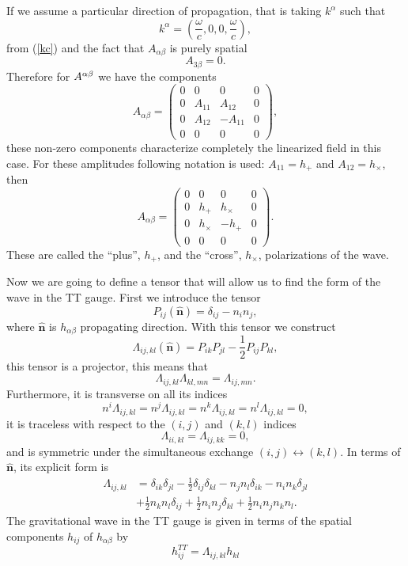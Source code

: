 If we assume a particular direction of propagation, that is taking
$k^{\alpha}$ such that
\begin{equation}
k^{\alpha}=\left(\frac{\omega}{c},0,0,\frac{\omega}{c}\right),\label{eq:kz}
\end{equation}
from (\ref{kc}) and the fact that $A_{\alpha\beta}$ is purely spatial
\[
A_{3\beta}=0.
\]
Therefore for $A^{\alpha\text{\ensuremath{\beta}}}$ we have the components
\[
A_{\alpha\beta}=\left(\begin{array}{cccc}
0 & 0 & 0 & 0\\
0 & A_{11} & A_{12} & 0\\
0 & A_{12} & -A_{11} & 0\\
0 & 0 & 0 & 0
\end{array}\right),
\]
these non-zero components characterize completely the linearized field
in this case. For these amplitudes following notation is used: $A_{11}=h_{+}$
and $A_{12}=h_{\times}$, then
\begin{equation}
A_{\alpha\beta}=\left(\begin{array}{cccc}
0 & 0 & 0 & 0\\
0 & h_{+} & h_{\times} & 0\\
0 & h_{\times} & -h_{+} & 0\\
0 & 0 & 0 & 0
\end{array}\right).\label{eq:A-plus-cross}
\end{equation}
These are called the ``plus'', $h_{+}$, and the ``cross'', $h_{\times}$,
polarizations of the wave. 

Now we are going to define a tensor that will allow us to find the
form of the wave in the TT gauge. First we introduce the tensor
\[
P_{ij}\left(\hat{\boldsymbol{n}}\right)=\delta_{ij}-n_{i}n_{j},
\]
where $\hat{\boldsymbol{n}}$ is $h_{\alpha\beta}$ propagating direction.
With this tensor we construct
\[
\Lambda_{ij,kl}\left(\hat{\boldsymbol{n}}\right)=P_{ik}P_{jl}-\frac{1}{2}P_{ij}P_{kl},
\]
this tensor is a projector, this means that
\[
\Lambda_{ij,kl}\Lambda_{kl,mn}=\Lambda_{ij,mn}.
\]
Furthermore, it is transverse on all its indices
\[
n^{i}\Lambda_{ij,kl}=n^{j}\Lambda_{ij,kl}=n^{k}\Lambda_{ij,kl}=n^{l}\Lambda_{ij,kl}=0,
\]
it is traceless with respect to the $\left(i,j\right)$ and $\left(k,l\right)$
indices
\[
\Lambda_{ii,kl}=\Lambda_{ij,kk}=0,
\]
and is symmetric under the simultaneous exchange $\left(i,j\right)\longleftrightarrow\left(k,l\right)$.
In terms of $\hat{\boldsymbol{n}}$, its explicit form is
\begin{align*}
\Lambda_{ij,kl} & =\delta_{ik}\delta_{jl}-\frac{1}{2}\delta_{ij}\delta_{kl}-n_{j}n_{l}\delta_{ik}-n_{i}n_{k}\delta_{jl}\\
\  & +\frac{1}{2}n_{k}n_{l}\delta_{ij}+\frac{1}{2}n_{i}n_{j}\delta_{kl}+\frac{1}{2}n_{i}n_{j}n_{k}n_{l}.
\end{align*}
The gravitational wave in the TT gauge is given in terms of the spatial
components $h_{ij}$ of $h_{\alpha\beta}$ by
\[
h_{ij}^{TT}=\Lambda_{ij,kl}h_{kl}
\]


